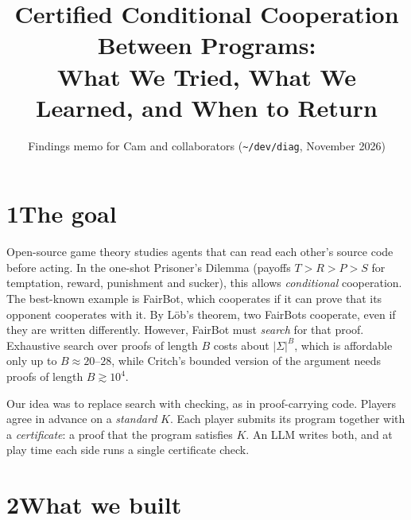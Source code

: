\documentclass[11pt]{article}
\title{\vspace{-1.5em}Certified Conditional Cooperation Between Programs:\\ What We Tried, What We Learned, and When to Return}
\author{Findings memo for Cam and collaborators \quad (\texttt{\~{}/dev/diag}, November 2026)}
\date{\vspace{-2.5em}}
\begin{document}
\maketitle

\begin{center}
\end{center}

\section*{1\quad The goal}

Open-source game theory studies agents that can read each other's source code before acting. In the one-shot Prisoner's Dilemma (payoffs $T > R > P > S$ for temptation, reward, punishment and sucker), this allows \emph{conditional} cooperation. The best-known example is FairBot, which cooperates if it can prove that its opponent cooperates with it. By Löb's theorem, two FairBots cooperate, even if they are written differently. However, FairBot must \emph{search} for that proof. Exhaustive search over proofs of length $B$ costs about $|\Sigma|^B$, which is affordable only up to $B \approx 20$--$28$, while Critch's bounded version of the argument needs proofs of length $B \gtrsim 10^4$.

Our idea was to replace search with checking, as in proof-carrying code. Players agree in advance on a \emph{standard} $K$. Each player submits its program together with a \emph{certificate}: a proof that the program satisfies $K$. An LLM writes both, and at play time each side runs a single certificate check.

\section*{2\quad What we built}
\end{document}
